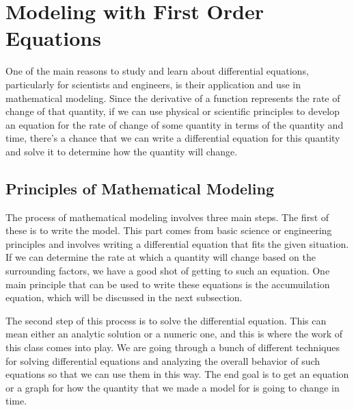 \section{Modeling with First Order Equations}
\label{modelfirst:section}



One of the main reasons to study and learn about differential equations, particularly for scientists and engineers, is their application and use in mathematical modeling. Since the derivative of a function represents the rate of change of that quantity, if we can use physical or scientific principles to develop an equation for the rate of change of some quantity in terms of the quantity and time, there's a chance that we can write a differential equation for this quantity and solve it to determine how the quantity will change. 

\subsection{Principles of Mathematical Modeling}

The process of mathematical modeling involves three main steps. The first of these is to write the model. This part comes from basic science or engineering principles and involves writing a differential equation that fits the given situation. If we can determine the rate at which a quantity will change based on the surrounding factors, we have a good shot of getting to such an equation. One main principle that can be used to write these equations is the accumuilation equation, which will be discussed in the next subsection. 

The second step of this process is to solve the differential equation. This can mean either an analytic solution or a numeric one, and this is where the work of this class comes into play. We are going through a bunch of different techniques for solving differential equations and analyzing the overall behavior of such equations so that we can use them in this way. The end goal is to get an equation or a graph for how the quantity that we made a model for is going to change in time.

